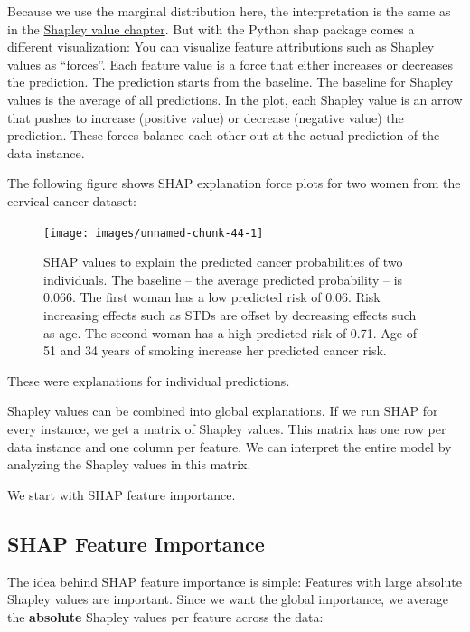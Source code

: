 \documentclass[
  10pt,
]{scrbook}
\begin{document}
Because we use the marginal distribution here, the interpretation is the same as in the \protect\hyperlink{shapley}{Shapley value chapter}.
But with the Python shap package comes a different visualization:
You can visualize feature attributions such as Shapley values as ``forces''.
Each feature value is a force that either increases or decreases the prediction.
The prediction starts from the baseline.
The baseline for Shapley values is the average of all predictions.
In the plot, each Shapley value is an arrow that pushes to increase (positive value) or decrease (negative value) the prediction.
These forces balance each other out at the actual prediction of the data instance.

The following figure shows SHAP explanation force plots for two women from the cervical cancer dataset:

\begin{figure}

{\centering \texttt{[image: images/unnamed-chunk-44-1]} 

}

\caption{SHAP values to explain the predicted cancer probabilities of two individuals. The baseline -- the average predicted probability -- is 0.066. The first woman has a low predicted risk of 0.06. Risk increasing effects such as STDs are offset by decreasing effects such as age. The second woman has a high predicted risk of 0.71. Age of 51 and 34 years of smoking increase her predicted cancer risk.}\label{fig:unnamed-chunk-44}
\end{figure}

These were explanations for individual predictions.

Shapley values can be combined into global explanations.
If we run SHAP for every instance, we get a matrix of Shapley values.
This matrix has one row per data instance and one column per feature.
We can interpret the entire model by analyzing the Shapley values in this matrix.

We start with SHAP feature importance.

\hypertarget{shap-feature-importance}{%
\subsection{SHAP Feature Importance}\label{shap-feature-importance}}

The idea behind SHAP feature importance is simple:
Features with large absolute Shapley values are important.
Since we want the global importance, we average the \textbf{absolute} Shapley values per feature across the data:
\end{document}
